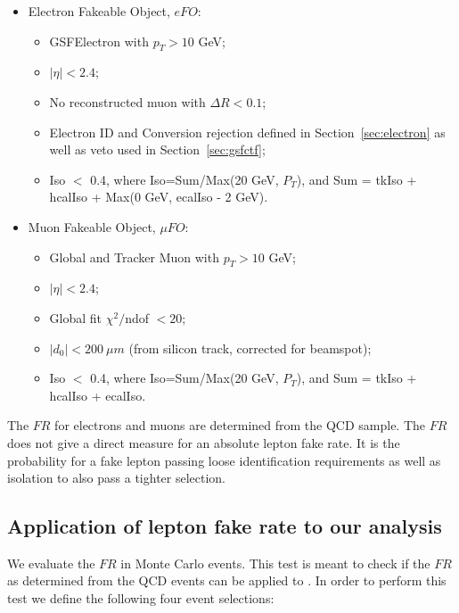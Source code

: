 \begin{itemize}
\item Electron Fakeable Object, $eFO$:
\begin{itemize}
\item GSFElectron with $p_T > 10$ GeV;
\item $|\eta| < 2.4$;
\item No reconstructed muon with $\Delta R < 0.1$;
\item Electron ID and Conversion rejection defined in Section~\ref{sec:electron} as well as veto used in Section~\ref{sec:gsfctf};
\item Iso $<$ 0.4, where Iso=Sum/Max(20 GeV, $P_T$), and Sum = tkIso + hcalIso +  Max(0 GeV, ecalIso - 2 GeV).
\end{itemize} 

\item Muon Fakeable Object, $\mu FO$:
\begin{itemize}
\item Global and Tracker Muon with $p_T > 10$ GeV;
\item $|\eta| < 2.4$;
\item Global fit $\chi^2 /$ndof $ < 20 $;
\item $|d_0| < 200~\mu m$ (from silicon track, corrected for beamspot);
\item Iso $<$ 0.4, where Iso=Sum/Max(20 GeV, $P_T$), and Sum = tkIso + hcalIso +  ecalIso.
\end{itemize} 
\end{itemize} 

The $FR$ for electrons and muons are determined from the QCD sample.
The $FR$ does not give a direct measure for an absolute lepton fake rate. It is the probability for a
fake lepton passing loose identification requirements as well as isolation to also pass a tighter
selection. 

\subsection{Application of lepton fake rate to our analysis}
\label{subsec:fakerateapplication}

We evaluate the $FR$ in \ttbar Monte Carlo events. This test is meant to check if the 
$FR$ as determined from the QCD events can be applied to \ttbar. In order to perform this test we 
define the following four event selections:

